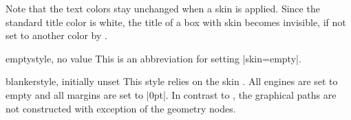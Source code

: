 \begin{marker}
  Note that the text colors stay unchanged when a skin is applied.
  Since the standard title color
  is white, the title of a box with skin  becomes
  invisible, if not set to another color by .
\end{marker}


\begin{docTcbKey}{empty}{}{style, no value}
  This is an abbreviation for setting |skin=empty|.
\end{docTcbKey}


\begin{dispExample}
\end{dispExample}


\clearpage
\begin{docTcbKey}{blanker}{}{style, initially unset}
  This style relies on the skin . All engines
  are set to empty and all margins are set to |0pt|.
  In contrast to , the graphical paths are
  not constructed with exception of the geometry nodes.
\begin{dispExample}
\begin{tcolorbox}[blanker,watermark text=A blank box]
\lipsum[1]
\end{tcolorbox}
\end{dispExample}

\end{docTcbKey}



